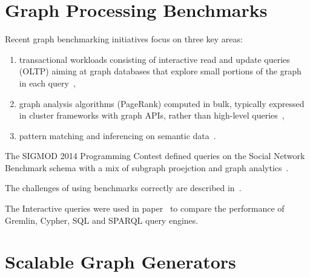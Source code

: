 
\section{Graph Processing Benchmarks}

Recent graph benchmarking initiatives focus on three key areas:

\begin{enumerate}
\item transactional workloads consisting of interactive read and update queries (OLTP) aiming at graph databases that explore small portions of the graph in each query~\cite{DBLP:conf/cidr/BarahmandG13,DBLP:conf/sigmod/ArmstrongPBC13,DBLP:journals/ase/DayarathnaS14,DBLP:conf/sigmod/ErlingALCGPPB15,DBLP:journals/pvldb/LissandriniBV18},
\item graph analysis algorithms (\eg PageRank) computed in bulk, typically expressed in cluster frameworks with graph APIs, rather than high-level queries~\cite{DBLP:conf/hipc/BaderM05,DBLP:conf/bigdataconf/ElserM13,DBLP:conf/sc/NaiXTKL15,DBLP:journals/pvldb/IosupHNHPMCCSAT16},
\item pattern matching and inferencing on semantic data~\cite{DBLP:journals/ws/GuoPH05,DBLP:books/sp/virgilio09/SchmidtHMPL09,DBLP:conf/semweb/MorseyLAN11,DBLP:conf/semweb/AlucHOD14,DBLP:journals/sosym/SzarnyasIRV18}.
\end{enumerate}

The SIGMOD 2014 Programming Contest defined queries on the Social Network Benchmark schema with a mix of subgraph proejction and graph analytics~\cite{DBLP:journals/corr/abs-2010-12243}.

The challenges of using benchmarks correctly are described in~\cite{DBLP:conf/sigmod/RaasveldtHGM18}.

The Interactive queries were used in paper~\cite{DBLP:conf/grades/PacaciZLO17} to compare the performance of Gremlin, Cypher, SQL and SPARQL query engines.


\section{Scalable Graph Generators}

